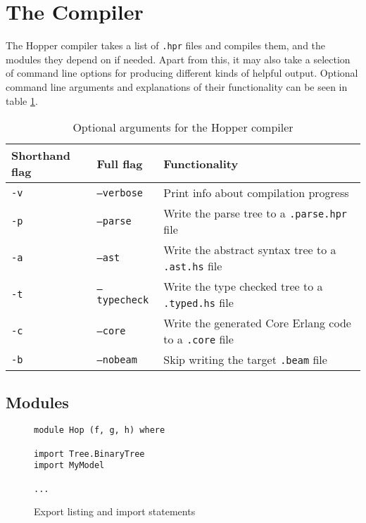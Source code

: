 \section{The Compiler}

The Hopper compiler takes a list of \texttt{.hpr} files and compiles them, and the modules they depend on if needed. Apart from this, it may also take a selection of command line options for producing different kinds of helpful output. Optional command line arguments and explanations of their functionality can be seen in table \ref{tab:flags}.

\begin{table}[!htb]
\centering
\begin{tabular}{| l | l | l |}
\hline
Shorthand flag & Full flag            & Functionality\\
\hline
\texttt{-v}    & \texttt{--verbose}   & Print info about compilation progress\\
\texttt{-p}    & \texttt{--parse}     & Write the parse tree to a \texttt{.parse.hpr} file\\
\texttt{-a}    & \texttt{--ast}       & Write the abstract syntax tree to a \texttt{.ast.hs} file\\
\texttt{-t}    & \texttt{--typecheck} & Write the type checked tree to a \texttt{.typed.hs} file\\
\texttt{-c}    & \texttt{--core}      & Write the generated Core Erlang code to a \texttt{.core} file\\
\texttt{-b}    & \texttt{--nobeam}    & Skip writing the target \texttt{.beam} file\\
\hline
\end{tabular}
\caption[Optional arguments for the Hopper compiler]{Optional arguments for the Hopper compiler}
\label{tab:flags}
\end{table}



\subsection{Modules}

\begin{figure}[!htb]
\centering
\begin{minipage}[b]{0.43\linewidth}
\centering
\begin{lstlisting}
module Hop (f, g, h) where

import Tree.BinaryTree
import MyModel

...
\end{lstlisting}
\end{minipage}
\caption{Export listing and import statements}
\label{lst:exportimport}
\end{figure}

